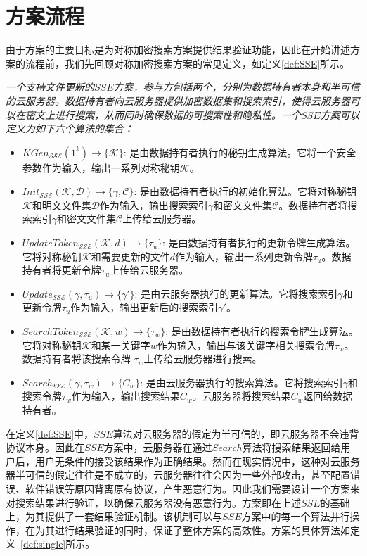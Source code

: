 \section{方案流程}
由于\single 方案的主要目标是为对称加密搜索方案提供结果验证功能，因此在开始讲述\single 方案的流程前，我们先回顾对称加密搜索方案的常见定义，如定义\ref{def:SSE}所示。
\begin{definition}\label{def:SSE}
  {\itshape
    一个支持文件更新的$SSE$方案，参与方包括两个，分别为数据持有者本身和半可信的云服务器。数据持有者向云服务器提供加密数据集和搜索索引，使得云服务器可以在密文上进行搜索，从而同时确保数据的可搜索性和隐私性。一个$SSE$方案可以定义为如下六个算法的集合：
    \begin{itemize}
      \item $KGen_{\mathcal{SSE}}(1^k) \rightarrow \{\mathcal{K}\}$: 是由数据持有者执行的秘钥生成算法。它将一个安全参数作为输入，输出一系列对称秘钥$\mathcal{K}$。
      \item $Init_{\mathcal{SSE}}(\mathcal{K}, \mathcal{D}) \rightarrow \{\gamma, \mathcal{C}\}$: 是由数据持有者执行的初始化算法。它将对称秘钥$\mathcal{K}$和明文文件集$\mathcal{D}$作为输入，输出搜索索引$\gamma$和密文文件集$\mathcal{C}$。数据持有者将搜索索引$\gamma$和密文文件集$\mathcal{C}$上传给云服务器。
      \item $UpdateToken_{\mathcal{SSE}}(\mathcal{K}, d) \rightarrow \{\tau_u\}$: 是由数据持有者执行的更新令牌生成算法。它将对称秘钥$\mathcal{K}$和需要更新的文件$d$作为输入，输出一系列更新令牌$\tau_u$。数据持有者将更新令牌$\tau_u$上传给云服务器。
      \item $Update_{\mathcal{SSE}}(\gamma, \tau_u) \rightarrow \{\gamma'\}$: 是由云服务器执行的更新算法。它将搜索索引$\gamma$和更新令牌$\tau_u$作为输入，输出更新后的搜索索引$\gamma'$。
      \item $SearchToken_{\mathcal{SSE}}(\mathcal{K}, w) \rightarrow \{\tau_{w}\}$: 是由数据持有者执行的搜索令牌生成算法。它将对称秘钥$\mathcal{K}$和某一关键字$w$作为输入，输出与该关键字相关搜索令牌$\tau_{w}$。数据持有者将该搜索令牌 $\tau_{w}$上传给云服务器进行搜索。
      \item $Search_{\mathcal{SSE}}(\gamma, \tau_{w}) \rightarrow \{C_w\}$: 是由云服务器执行的搜索算法。它将搜索索引$\gamma$和搜索令牌$\tau_{w}$作为输入，输出搜索结果$C_w$。云服务器将搜索结果$C_w$返回给数据持有者。
    \end{itemize}
  }
\end{definition}

在定义\ref{def:SSE}中，$SSE$算法对云服务器的假定为半可信的，即云服务器不会违背协议本身。因此在$SSE$方案中，云服务器在通过$Search$算法将搜索结果返回给用户后，用户无条件的接受该结果作为正确结果。然而在现实情况中，这种对云服务器半可信的假定往往是不成立的，云服务器往往会因为一些外部攻击，甚至配置错误、软件错误等原因背离原有协议，产生恶意行为。因此我们需要设计一个方案来对搜索结果进行验证，以确保云服务器没有恶意行为。\single 方案即在上述$SSE$的基础上，为其提供了一套结果验证机制。该机制可以与$SSE$方案中的每一个算法并行操作，在为其进行结果验证的同时，保证了整体方案的高效性。\single 方案的具体算法如定义~\ref{def:single}所示。

